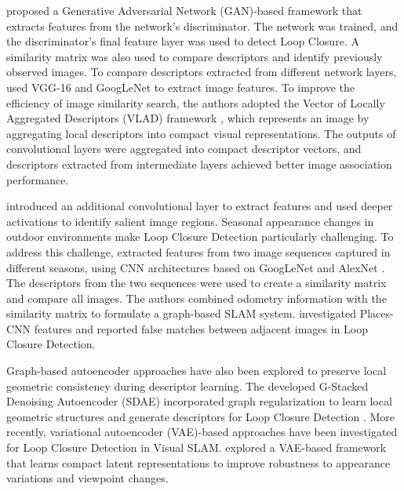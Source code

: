 \documentclass{ieeeaccess}
\begin{document}
\cite{Chen2025PanoramicSemanticTopologicalMap} proposed a Generative Adversarial Network (GAN)-based framework that extracts features from the network's discriminator. The network was trained, and the discriminator's final feature layer was used to detect Loop Closure. A similarity matrix was also used to compare descriptors and identify previously observed images. To compare descriptors extracted from different network layers, \cite{Ng2015LocalDeepFeaturesImageRetrieval} used VGG-16 \cite{Simonyan2015VGG} and GoogLeNet \cite{Szegedy2015GoogLeNet} to extract image features. To improve the efficiency of image similarity search, the authors adopted the Vector of Locally Aggregated Descriptors (VLAD) framework \cite{Jegou2010VLAD}, which represents an image by aggregating local descriptors into compact visual representations. The outputs of convolutional layers were aggregated into compact descriptor vectors, and descriptors extracted from intermediate layers achieved better image association performance.

\cite{Chen2017OnlyLookOnce} introduced an additional convolutional layer to extract features and used deeper activations to identify salient image regions. Seasonal appearance changes in outdoor environments make Loop Closure Detection particularly challenging. To address this challenge, \cite{Naseer2015RobustVisualSLAMAcrossSeasons} extracted features from two image sequences captured in different seasons, using CNN architectures based on GoogLeNet \cite{Szegedy2015GoogLeNet} and AlexNet \cite{Krizhevsky2017AlexNetCACM}. The descriptors from the two sequences were used to create a similarity matrix and compare all images. The authors combined odometry information with the similarity matrix to formulate a graph-based SLAM system. \cite{Bai2016MatchingRangeCNNLoopClosure} investigated Places-CNN features and reported false matches between adjacent images in Loop Closure Detection. 

Graph-based autoencoder approaches have also been explored to preserve local geometric consistency during descriptor learning. The developed G-Stacked Denoising Autoencoder (SDAE) incorporated graph regularization to learn local geometric structures and generate descriptors for Loop Closure Detection \cite{Vincent2010StackedDenoisingAutoencoders,Wang2019GraphAutoEncoderLoopClosure}. More recently, variational autoencoder (VAE)-based approaches have been investigated for Loop Closure Detection in Visual SLAM. \cite{song2024vae} explored a VAE-based framework that learns compact latent representations to improve robustness to appearance variations and viewpoint changes.
\end{document}
